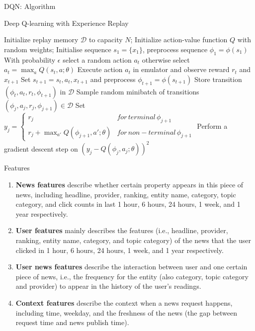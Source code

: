 \begin{frame}{DQN: Algorithm}
\begin{algorithm}[H]
\caption{Deep Q-learning with Experience Replay}
	\begin{algorithmic}[1]
	    \State Initialize replay memory $\mathcal{D}$ to capacity $N$;
	    \State Initialize action-value function $Q$ with random weights;
		    \State Initialise sequence $s_1 = \{x_1\}$, preprocess sequence $\phi_1 = \phi(s_1)$
		    \State With probability $\epsilon$ select a random action $a_t$
		    \State otherwise select $a_t = \max_a Q(s_t, a; \theta)$ 
		    \State Execute action $a_t$ in emulator and observe reward $r_t$ and $x_{t+1}$
		    \State Set $s_{t+1} = s_t, a_t, x_{t+1}$ and preprocess $\phi_{t+1} = \phi(s_{t+1})$
		    \State Store transition $(\phi_t, a_t, r_t, \phi_{t+1})$ in $\mathcal{D}$
		    \State Sample random minibatch of transitions $(\phi_j , a_j , r_j , \phi_{j+1}) \in \mathcal{D}$
		    \State Set $y_j = \begin{cases}
		            r_j & for\, terminal \, \phi_{j+1} \\
		            r_j + \max_{a'} Q(\phi_{j+1}, a'; \theta) & for\, non-terminal \, \phi_{j+1}
		            \end{cases}$
		    \State Perform a gradient descent step on $(y_j − Q(\phi_j , a_j ; \theta))^2$
		    \EndFor
		\EndFor
	\end{algorithmic} 
\end{algorithm}
\end{frame}

\begin{frame}{Features}
\begin{enumerate}
    \item \textbf{News features} describe whether certain property appears in this piece of news, including headline, provider, ranking, entity name, category, topic category, and click counts in last 1 hour, 6 hours, 24 hours, 1 week, and 1 year respectively.
    \item \textbf{User features} mainly describes the features (i.e., headline, provider, ranking, entity name, category, and topic category) of the news that the user clicked in 1 hour, 6 hours, 24 hours, 1 week, and 1 year respectively.
    \item \textbf{User news features} describe the interaction between user and one certain piece of news, i.e., the frequency for the entity (also category, topic category and provider) to appear in the history of the user’s readings.
    \item \textbf{Context features} describe the context when a news request happens, including time, weekday, and the freshness of the news (the gap between request time and news publish time).
\end{enumerate}
    
\end{frame}

